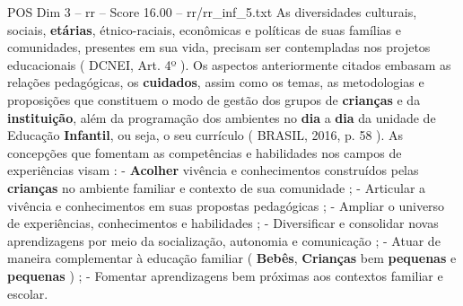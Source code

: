 \begin{textsample}{POS Dim 3 – rr – Score 16.00 – rr/rr\_inf\_5.txt}
As diversidades culturais, sociais, \textbf{etárias}, étnico-raciais, econômicas e políticas de suas famílias e comunidades, presentes em sua vida, precisam ser contempladas nos projetos educacionais ( DCNEI, Art. 4º ).
Os aspectos anteriormente citados embasam as relações pedagógicas, os \textbf{cuidados}, assim como os temas, as metodologias e proposições que constituem o modo de gestão dos grupos de \textbf{crianças} e da \textbf{instituição}, além da programação dos ambientes no \textbf{dia} a \textbf{dia} da unidade de Educação \textbf{Infantil}, ou seja, o seu currículo ( BRASIL, 2016, p. 58 ).
As concepções que fomentam as competências e habilidades nos campos de experiências visam : - \textbf{Acolher} vivência e conhecimentos construídos pelas \textbf{crianças} no ambiente familiar e contexto de sua comunidade ; - Articular a vivência e conhecimentos em suas propostas pedagógicas ; - Ampliar o universo de experiências, conhecimentos e habilidades ; - Diversificar e consolidar novas aprendizagens por meio da socialização, autonomia e comunicação ; - Atuar de maneira complementar à educação familiar ( \textbf{Bebês}, \textbf{Crianças} bem \textbf{pequenas} e \textbf{pequenas} ) ; - Fomentar aprendizagens bem próximas aos contextos familiar e escolar.

\end{textsample}
